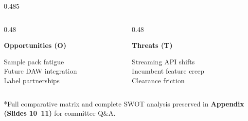 \begin{frame}[t]
\begin{columns}[onlytextwidth, T]
\begin{column}{0.485\textwidth}
\begin{tcolorbox}[standardcard, top=3.5pt, bottom=3.5pt, left=6pt, right=6pt]
        \begin{columns}[onlytextwidth, T]
          \begin{column}{0.48\textwidth}
            \begin{tcolorbox}[innercard, top=3pt, bottom=3pt, left=3.5pt, right=3.5pt]
              {\scriptsize\bfseries\textcolor{accentemerald}{Opportunities (O)}}\par\vspace{0.6mm}
              {\tiny\textbullet{} Sample pack fatigue}\\[0.2mm]
              {\tiny\textbullet{} Future DAW integration}\\[0.2mm]
              {\tiny\textbullet{} Label partnerships}
            \end{tcolorbox}
          \end{column}
          \begin{column}{0.48\textwidth}
            \begin{tcolorbox}[innercard, top=3pt, bottom=3pt, left=3.5pt, right=3.5pt]
              {\scriptsize\bfseries\textcolor{textdim}{Threats (T)}}\par\vspace{0.6mm}
              {\tiny\textbullet{} Streaming API shifts}\\[0.2mm]
              {\tiny\textbullet{} Incumbent feature creep}\\[0.2mm]
              {\tiny\textbullet{} Clearance friction}
            \end{tcolorbox}
          \end{column}
        \end{columns}
      \end{tcolorbox}
    \end{column}
  \end{columns}

  \vspace{1.5mm}

  \begin{tcolorbox}[innercard, left=6pt, right=6pt, top=2pt, bottom=2pt]
    \centering
    {\tiny\textcolor{textdim}{*Full comparative matrix and complete SWOT analysis preserved in} \textbf{\textcolor{accentemerald}{Appendix (Slides 10--11)}} \textcolor{textdim}{for committee Q\&A.}}
  \end{tcolorbox}
\end{frame}
